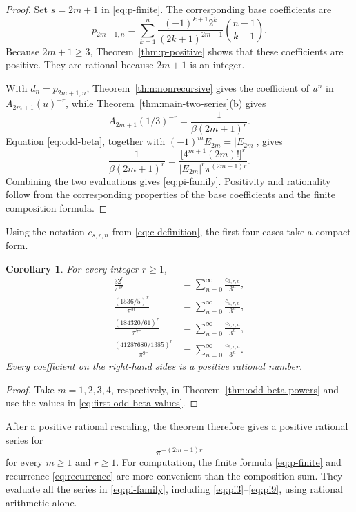 \documentclass[11pt,reqno]{amsart}
\numberwithin{equation}{section}
\newtheorem{corollary}[theorem]{Corollary}
\theoremstyle{definition}
\theoremstyle{remark}
\begin{document}
\begin{proof}
Set \(s=2m+1\) in \eqref{eq:p-finite}.  The corresponding base
coefficients are
\[
 p_{2m+1,n}
 =
 \sum_{k=1}^{n}
 \frac{(-1)^{k+1}2^k}{(2k+1)^{2m+1}}
 \binom{n-1}{k-1}.
\]
Because \(2m+1\geq3\), Theorem~\ref{thm:p-positive} shows that these
coefficients are positive.  They are rational because \(2m+1\) is an
integer.

With \(d_n=p_{2m+1,n}\), Theorem~\ref{thm:nonrecursive} gives the
coefficient of \(u^n\) in \(A_{2m+1}(u)^{-r}\), while
Theorem~\ref{thm:main-two-series}(b) gives
\[
 A_{2m+1}(1/3)^{-r}
 =
 \frac1{\beta(2m+1)^r}.
\]
Equation \eqref{eq:odd-beta}, together with
\(
 (-1)^mE_{2m}=|E_{2m}|
\), gives
\[
 \frac1{\beta(2m+1)^r}
 =
 \frac{\bigl[4^{m+1}(2m)!\bigr]^r}
 {|E_{2m}|^r\pi^{(2m+1)r}}.
\]
Combining the two evaluations gives \eqref{eq:pi-family}.  Positivity
and rationality follow from the corresponding properties of the base
coefficients and the finite composition formula.
\end{proof}

Using the notation \(c_{s,r,n}\) from \eqref{eq:c-definition}, the
first four cases take a compact form.

\begin{corollary}\label{cor:first-four-odd-beta}
For every integer \(r\geq1\),
\begin{align}
 \frac{32^r}{\pi^{3r}}
 &=\sum_{n=0}^{\infty}\frac{c_{3,r,n}}{3^n},
 \label{eq:pi3}\\
 \frac{(1536/5)^r}{\pi^{5r}}
 &=\sum_{n=0}^{\infty}\frac{c_{5,r,n}}{3^n},
 \label{eq:pi5}\\
 \frac{(184320/61)^r}{\pi^{7r}}
 &=\sum_{n=0}^{\infty}\frac{c_{7,r,n}}{3^n},
 \label{eq:pi7}\\
 \frac{(41287680/1385)^r}{\pi^{9r}}
 &=\sum_{n=0}^{\infty}\frac{c_{9,r,n}}{3^n}.
 \label{eq:pi9}
\end{align}
Every coefficient on the right-hand sides is a positive rational
number.
\end{corollary}

\begin{proof}
Take \(m=1,2,3,4\), respectively, in
Theorem~\ref{thm:odd-beta-powers} and use the values in
\eqref{eq:first-odd-beta-values}.
\end{proof}

After a positive rational rescaling, the theorem therefore gives a
positive rational series for
\[
 \pi^{-(2m+1)r}
\]
for every \(m\geq1\) and \(r\geq1\).
For computation, the finite formula \eqref{eq:p-finite} and recurrence
\eqref{eq:recurrence} are more convenient than the composition sum.
They evaluate all the series in \eqref{eq:pi-family}, including
\eqref{eq:pi3}--\eqref{eq:pi9}, using rational arithmetic alone.
\end{document}
